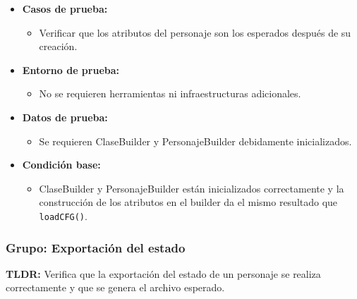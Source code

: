 \documentclass{article}
\begin{document}
\begin{itemize}
	\item \textbf{Casos de prueba:}
	\begin{itemize}
		\item Verificar que los atributos del personaje son los esperados después de su creación.
	\end{itemize}
	
	\item \textbf{Entorno de prueba:}
	\begin{itemize}
		\item No se requieren herramientas ni infraestructuras adicionales.
	\end{itemize}
	
	\item \textbf{Datos de prueba:}
	\begin{itemize}
		\item Se requieren ClaseBuilder y PersonajeBuilder debidamente inicializados.
	\end{itemize}
	
\item \textbf{Condición base:}
\begin{itemize}
	\item ClaseBuilder y PersonajeBuilder están inicializados correctamente y la construcción de los atributos en el builder da el mismo resultado que \texttt{loadCFG()}.
\end{itemize}
\end{itemize}


\subsubsection{Grupo: Exportación del estado}
\textbf{TLDR:} Verifica que la exportación del estado de un personaje se realiza correctamente y que se genera el archivo esperado.
\end{document}
